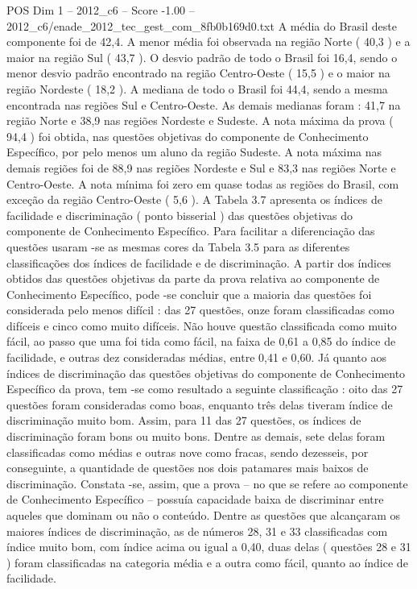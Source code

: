 \begin{textsample}{POS Dim 1 – 2012\_c6 – Score -1.00 – 2012\_c6/enade\_2012\_tec\_gest\_com\_8fb0b169d0.txt}
A média do Brasil deste componente foi de 42,4.
A menor média foi observada na região Norte ( 40,3 ) e a maior na região Sul ( 43,7 ).
O desvio padrão de todo o Brasil foi 16,4, sendo o menor desvio padrão encontrado na região Centro-Oeste ( 15,5 ) e o maior na região Nordeste ( 18,2 ).
A mediana de todo o Brasil foi 44,4, sendo a mesma encontrada nas regiões Sul e Centro-Oeste.
As demais medianas foram : 41,7 na região Norte e 38,9 nas regiões Nordeste e Sudeste.
A nota máxima da prova ( 94,4 ) foi obtida, nas questões objetivas do componente de Conhecimento Específico, por pelo menos um aluno da região Sudeste.
A nota máxima nas demais regiões foi de 88,9 nas regiões Nordeste e Sul e 83,3 nas regiões Norte e Centro-Oeste.
A nota mínima foi zero em quase todas as regiões do Brasil, com exceção da região Centro-Oeste ( 5,6 ).
A Tabela 3.7 apresenta os índices de facilidade e discriminação ( ponto bisserial ) das questões objetivas do componente de Conhecimento Específico.
Para facilitar a diferenciação das questões usaram -se as mesmas cores da Tabela 3.5 para as diferentes classificações dos índices de facilidade e de discriminação.
A partir dos índices obtidos das questões objetivas da parte da prova relativa ao componente de Conhecimento Específico, pode -se concluir que a maioria das questões foi considerada pelo menos difícil : das 27 questões, onze foram classificadas como difíceis e cinco como muito difíceis.
Não houve questão classificada como muito fácil, ao passo que uma foi tida como fácil, na faixa de 0,61 a 0,85 do índice de facilidade, e outras dez consideradas médias, entre 0,41 e 0,60.
Já quanto aos índices de discriminação das questões objetivas do componente de Conhecimento Específico da prova, tem -se como resultado a seguinte classificação : oito das 27 questões foram consideradas como boas, enquanto três delas tiveram índice de discriminação muito bom.
Assim, para 11 das 27 questões, os índices de discriminação foram bons ou muito bons.
Dentre as demais, sete delas foram classificadas como médias e outras nove como fracas, sendo dezesseis, por conseguinte, a quantidade de questões nos dois patamares mais baixos de discriminação.
Constata -se, assim, que a prova – no que se refere ao componente de Conhecimento Específico – possuía capacidade baixa de discriminar entre aqueles que dominam ou não o conteúdo.
Dentre as questões que alcançaram os maiores índices de discriminação, as de números 28, 31 e 33 classificadas com índice muito bom, com índice acima ou igual a 0,40, duas delas ( questões 28 e 31 ) foram classificadas na categoria média e a outra como fácil, quanto ao índice de facilidade.

\end{textsample}
